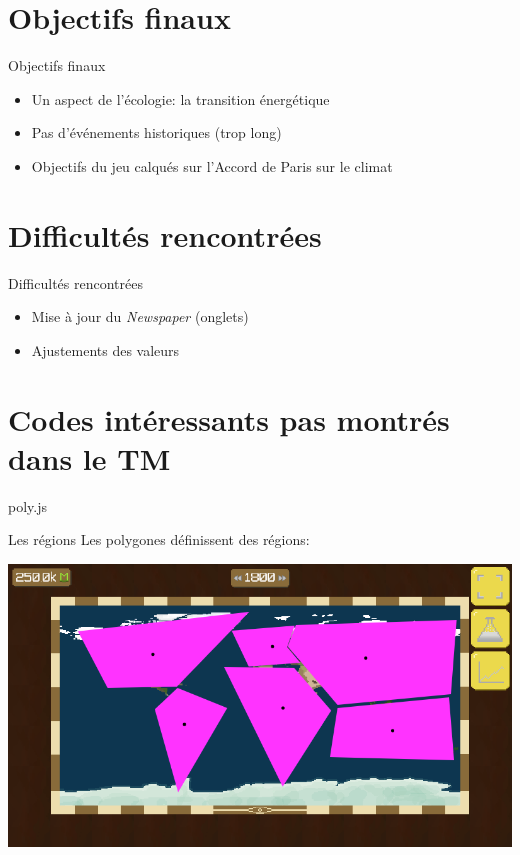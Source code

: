 \documentclass[11pt]{beamer}
\newcommand{\pauseditemize}{\pause \begin{itemize}[<+->]}
\begin{document}
\section{Objectifs finaux}

\begin{frame}{Objectifs finaux}

\pauseditemize
	\item Un aspect de l'écologie: la transition énergétique
	\item Pas d'événements historiques (trop long)
	\item Objectifs du jeu calqués sur l'Accord de Paris sur le climat
\end{itemize}

\end{frame}

\section{Difficultés rencontrées}

\begin{frame}{Difficultés rencontrées}

\pauseditemize
	\item Mise à jour du \textit{Newspaper} (onglets)
	\item Ajustements des valeurs
\end{itemize}

\end{frame}

\section{Codes intéressants pas montrés dans le TM} %

\begin{frame}{poly.js}



\end{frame}

\begin{frame}{Les régions}
Les polygones définissent des régions:
\begin{center} \includegraphics[scale=.3]{../images/regionsPoly} \end{center}
\end{frame}
\end{document}
